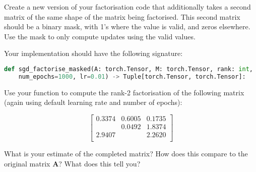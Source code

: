 \documentclass[a4paper]{article}
\begin{document}
\begin{tcolorbox}[title=3.1 Implement and test masked factorisation (1 mark)]
	Create a new version of your factorisation code that additionally takes a second matrix of the same shape of the matrix being factorised. This second matrix should be a binary mask, with 1's where the value is valid, and zeros elsewhere. Use the mask to only compute updates using the valid values.

	Your implementation should have the following signature:

	\begin{lstlisting}[language=Python]
def sgd_factorise_masked(A: torch.Tensor, M: torch.Tensor, rank: int,
	num_epochs=1000, lr=0.01) -> Tuple[torch.Tensor, torch.Tensor]: 
	\end{lstlisting}

	Use your function to compute the rank-2 factorisation of the following matrix (again using default learning rate and number of epochs):

	\begin{equation*}
	\begin{bmatrix}
		0.3374 & 0.6005 & 0.1735 \\
		       & 0.0492 & 1.8374 \\
		2.9407 &        & 2.2620 \\
	\end{bmatrix}	
\end{equation*}

	What is your estimate of the completed matrix? How does this compare to the original matrix $\bm A$? What does this tell you?
\end{tcolorbox}
\end{document}
